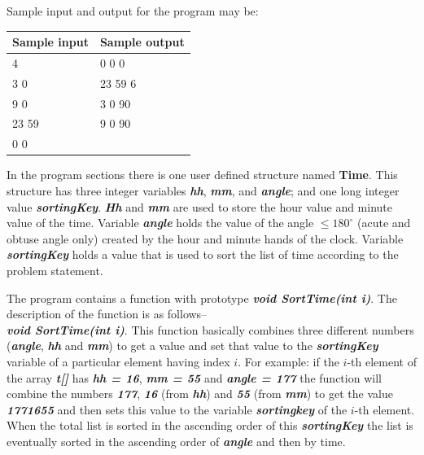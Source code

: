 \documentclass[12pt,a3paper]{article}
\begin{document}
\begin{enumerate}
\vspace{0.3cm}
\noindent Sample input and output for the program may be:
\begin{center}
\begin{tabular}{|l|l|}
\hline
\textbf{Sample input} & \textbf{Sample output} \\ \hline
4                     & 0 0 0                  \\ 
3 0                   & 23 59 6                \\ 
9 0                   & 3 0 90                 \\ 
23 59                 & 9 0 90                 \\ 
0 0                   &                        \\ \hline
\end{tabular}
\end{center}
\vspace{0.3cm}
 In the program sections there is one user defined structure named \textbf{Time}. This structure has three integer variables \textbf{\textit{hh}}, \textbf{\textit{mm}}, and \textbf{\textit{angle}}; and one long integer value \textbf{\textit{sortingKey}}. \textbf{\textit{Hh}} and \textbf{\textit{mm}} are used to store the hour value and minute value of the time. Variable \textbf{\textit{angle}} holds the value of the angle $\le 180^\circ$ (acute and obtuse angle only) created by the hour and minute hands of the clock. Variable \textbf{\textit{sortingKey}} holds a value that is used to sort the list of time according to the problem statement.

\noindent The program contains a function with prototype \textbf{\textit{void SortTime(int i)}}. The description of the function is as follows--\\
\noindent \textbf{\textit{void SortTime(int i)}}. This function basically combines three different numbers (\textbf{\textit{angle}}, \textbf{\textit{hh}} and \textbf{\textit{mm}}) to get a value and set that value to the \textbf{\textit{sortingKey}} variable of a particular element having index $i$. For example: if the $i$-th element of the array \textbf{\textit{t[]}} has \textbf{\textit{hh = 16}}, \textbf{\textit{mm = 55}} and \textbf{\textit{angle = 177}} the function will combine the numbers \textbf{\textit{177}}, \textbf{\textit{16}} (from \textbf{\textit{hh}}) and \textbf{\textit{55}} (from \textbf{\textit{mm}}) to get the value \textbf{\textit{1771655}} and then sets this value to the variable \textbf{\textit{sortingkey}} of the $i$-th element. When the total list is sorted in the ascending order of this \textbf{\textit{sortingKey}} the list is eventually sorted in the ascending order of \textbf{\textit{angle}} and then by time.


\end{enumerate}
\end{document}
